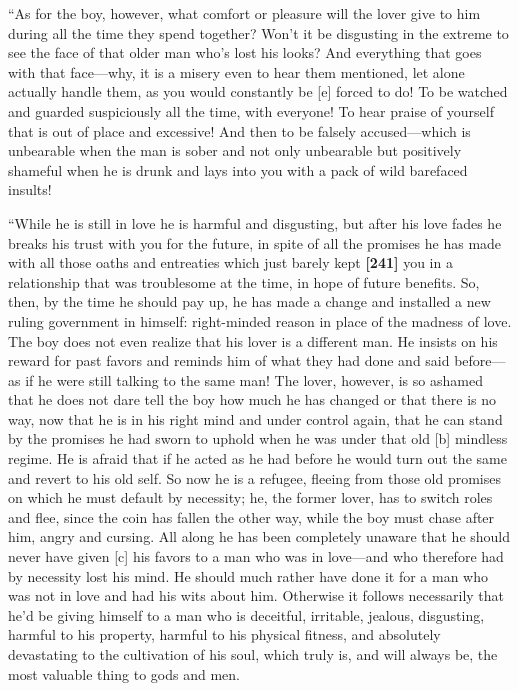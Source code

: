 “As for the boy, however, what comfort or pleasure will the lover give
to him during all the time they spend together? Won't it be disgusting
in the extreme to see the face of that older man who's lost his looks?
And everything that goes with that face---why, it is a misery even to
hear them mentioned, let alone actually handle them, as you would
constantly be {[}e{]} forced to do! To be watched and guarded
suspiciously all the time, with everyone! To hear praise of yourself
that is out of place and excessive! And then to be falsely
accused---which is unbearable when the man is sober and not only
unbearable but positively shameful when he is drunk and lays into you
with a pack of wild barefaced insults!

“While he is still in love he is harmful and disgusting, but after his
love fades he breaks his trust with you for the future, in spite of all
the promises he has made with all those oaths and entreaties which just
barely kept {\bf {[}241{]}} you in a relationship that was troublesome
at the time, in hope of future benefits. So, then, by the time he should
pay up, he has made a change and installed a new ruling government in
himself: right-minded reason in place of the madness of love. The boy
does not even realize that his lover is a different man. He insists on
his reward for past favors and reminds him of what they had done and
said before---as if he were still talking to the same man! The lover,
however, is so ashamed that he does not dare tell the boy how much he
has changed or that there is no way, now that he is in his right mind
and under control again, that he can stand by the promises he had sworn
to uphold when he was under that old {[}b{]} mindless regime. He is
afraid that if he acted as he had before he would turn out the same and
revert to his old self. So now he is a refugee, fleeing from those old
promises on which he must default by necessity; he, the former lover,
has to switch roles and flee, since the coin has fallen the other way,
while the boy must chase after him, angry and cursing. All along he has
been completely unaware that he should never have given {[}c{]} his
favors to a man who was in love---and who therefore had by necessity
lost his mind. He should much rather have done it for a man who was not
in love and had his wits about him. Otherwise it follows necessarily
that he'd be giving himself to a man who is deceitful, irritable,
jealous, disgusting, harmful to his property, harmful to his physical
fitness, and absolutely devastating to the cultivation of his soul,
which truly is, and will always be, the most valuable thing to gods and
men.

